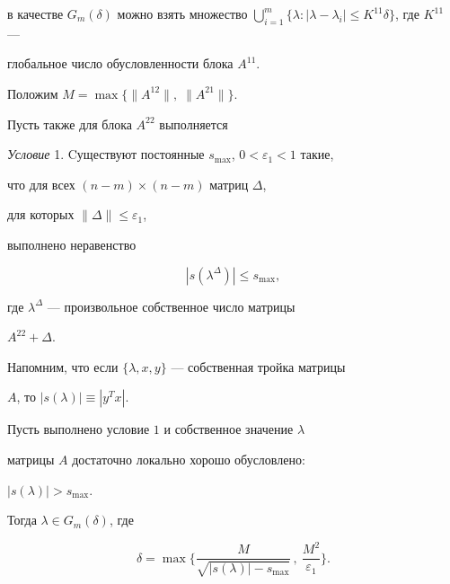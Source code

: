 в качестве $G_m(\delta)$ можно взять множество $\bigcup\limits_{i=1}^m


\{\lambda : |\lambda-\lambda_i| \le K^{11} \delta \}$, где $K^{11}$ ---


глобальное число обусловленности блока $A^{11}$.





Положим $M=\max\{\|A^{12}\|,\;\|A^{21}\|\}$.


Пусть также для блока $A^{22}$ выполняется


\medskip





{\it Условие} 1. Cуществуют постоянные $s_{\max}$, $0<\varepsilon_1<1$ такие,


что для всех $(n-m)\times (n-m)$  матриц $\Delta$,


для которых $\|\Delta\|\le \varepsilon_1$,


выполнено неравенство


$$


|s(\lambda^\Delta)|\le s_{\max},


$$


где $\lambda^\Delta$ --- произвольное собственное число матрицы


$A^{22}+\Delta$.


\medskip





Напомним, что если $\{\lambda, x, y\}$ --- собственная тройка матрицы


$A$, то $|s(\lambda)|\equiv |y^T x|$.





\begin{lem}


Пусть выполнено условие $1$ и собственное значение $\lambda$


матрицы $A$ достаточно локально хорошо обусловлено\/$:$


$|s(\lambda)|>s_{\max}$.


Тогда $\lambda\in G_m(\delta)$, где


$$


\delta=\max \bigg\{\frac{M}{\sqrt{|s(\lambda)|-s_{\max}}}\,,


\ \frac{M^2}{\varepsilon_1}\bigg\}.


$$


\end{lem}





